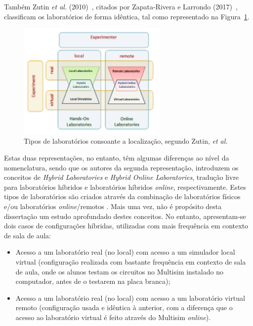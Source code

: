 Também Zutin \textit{et al.} (2010)~\cite{zutinlab2go}, citados por Zapata-Rivera e Larrondo (2017)~\cite{Zapata-Rivera}, classificam os laboratórios de forma idêntica, tal como representado na Figura~\ref{fig:classificaçãozutin}.

\begin{figure}[hbtp]
    \centering
    \includegraphics[width=0.65\textwidth]{figures/carac_lab.png}
    \caption{Tipos de laboratórios consoante a localização, segundo Zutin, \textit{et al.} \cite{zutinlab2go}}
    \label{fig:classificaçãozutin}
\end{figure}

Estas duas representações, no entanto, têm algumas diferenças ao nível da nomenclatura, sendo que os autores da segunda representação, introduzem os conceitos de \textit{Hybrid Laboratories} e \textit{Hybrid Online Laboratories}, tradução livre para laboratórios híbridos e laboratórios híbridos \textit{online}, respectivamente. Estes tipos de laboratórios são criados através da combinação de laboratórios físicos e/ou laboratórios \textit{online}/remotos \cite{Zapata-Rivera}. Mais uma vez, não é propósito desta dissertação um estudo aprofundado destes conceitos. No entanto, apresentam-se dois casos de configurações híbridas, utilizadas com mais frequência em contexto de sala de aula:

\begin{itemize}
    \item Acesso a um laboratório real (no local) com acesso a um simulador local virtual (configuração realizada com bastante frequência em contexto de sala de aula, onde os alunos testam os circuitos no Multisim instalado no computador, antes de o testarem na placa branca);
    \item Acesso a um laboratório real (no local) com acesso a um laboratório virtual remoto (configuração usada e idêntica à anterior, com a diferença que o acesso ao laboratório virtual é feito através do Multisim \textit{online}).
\end{itemize}

